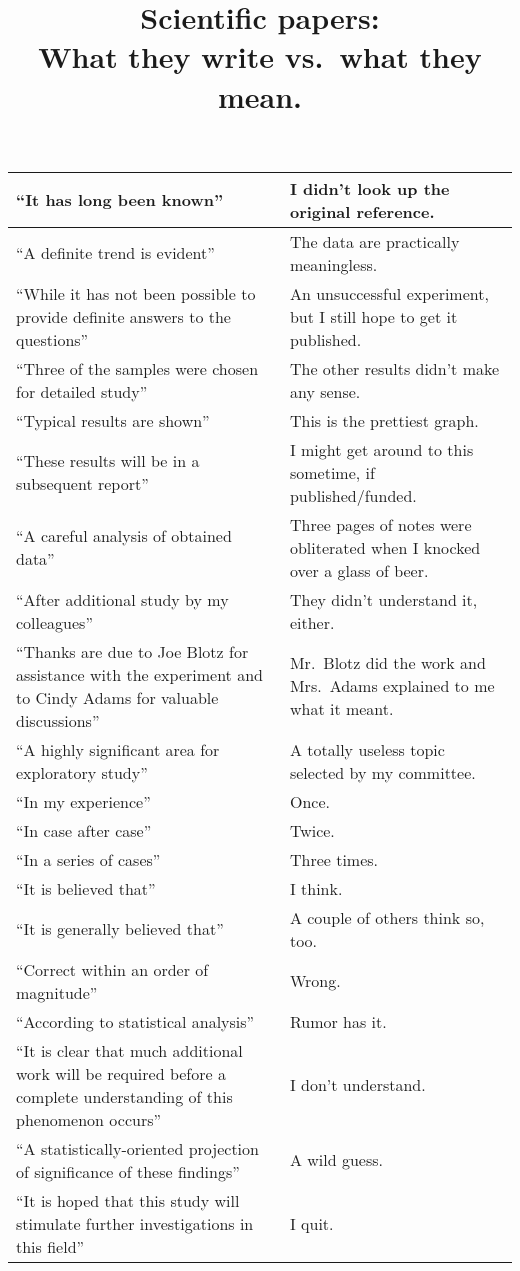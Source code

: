 \documentclass[14pt,a4paper]{extarticle}
\title{Scientific papers:\\What they write vs.\ what they mean.}
\date{\vspace{-10ex}}
\begin{document}

\maketitle

\begin{center}
  \begin{tabular}{ | p{8cm}  p{8cm} | }
    \hline
    ``It has long been known'' & I didn't look up the original reference. \\ \hline
    ``A definite trend is evident'' & The data are practically meaningless. \\ \hline
    ``While it has not been possible to provide definite answers to the questions'' & An unsuccessful experiment, but I still hope to get it published. \\ \hline
    ``Three of the samples were chosen for detailed study'' & The other results didn't make any sense. \\ \hline
    ``Typical results are shown'' & This is the prettiest graph. \\ \hline
    ``These results will be in a subsequent report'' & I might get around to this sometime, if published/funded. \\ \hline
    ``A careful analysis of obtained data'' & Three pages of notes were obliterated when I knocked over a glass of beer. \\ \hline
    ``After additional study by my colleagues'' & They didn't understand it, either. \\ \hline
    ``Thanks are due to Joe Blotz for assistance with the experiment and to Cindy Adams for valuable discussions'' & Mr.\ Blotz did the work and Mrs.\ Adams explained to me what it meant. \\ \hline
    ``A highly significant area for exploratory study'' & A totally useless topic selected by my committee. \\ \hline
    ``In my experience'' & Once. \\ \hline
    ``In case after case'' & Twice. \\ \hline
    ``In a series of cases'' & Three times. \\ \hline
    ``It is believed that'' & I think. \\ \hline
    ``It is generally believed that'' & A couple of others think so, too. \\ \hline
    ``Correct within an order of magnitude'' & Wrong. \\ \hline
    ``According to statistical analysis'' & Rumor has it. \\ \hline
    ``It is clear that much additional work will be required before a complete understanding of this phenomenon occurs'' & I don't understand. \\ \hline
    ``A statistically-oriented projection of significance of these findings'' & A wild guess. \\ \hline
    ``It is hoped that this study will stimulate further investigations in this field'' & I quit. \\
    \hline
  \end{tabular}
\end{center}
\end{document}
